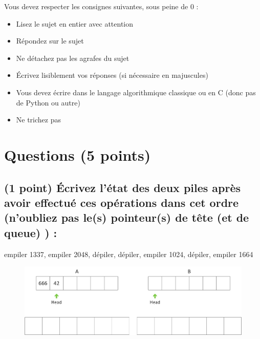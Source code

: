 \documentclass[11pt,a4paper]{article}
\begin{document}
\MakeExamTitle                   %


\bigskip
\bigskip

Vous devez respecter les consignes suivantes, sous peine de 0 :

\begin{itemize}
\item Lisez le sujet en entier avec attention
\item Répondez sur le sujet
\item Ne détachez pas les agrafes du sujet
\item \'Ecrivez lisiblement vos réponses (si nécessaire en majuscules)
\item Vous devez écrire dans le langage algorithmique classique ou en C (donc pas de Python ou autre)
\item Ne trichez pas
\end{itemize}

\bigskip


\section{Questions (5 points)}

\subsection{(1 point) \'Ecrivez l'état des deux piles après avoir effectué ces opérations dans cet ordre (n'oubliez pas le(s) pointeur(s) de tête (et de queue) ) : }

\bigskip

\vfill
\hspace{0pt}

\begin{center}

\begin{large}
empiler 1337, empiler 2048, dépiler, dépiler, empiler 1024, dépiler, empiler 1664
\end{large}


\bigskip

\begin{figure}[ht!]
\centering
\centerline{  %
\includegraphics[scale=1]{img/Exercice1.png}
}
\end{figure}

\end{center}
\end{document}
